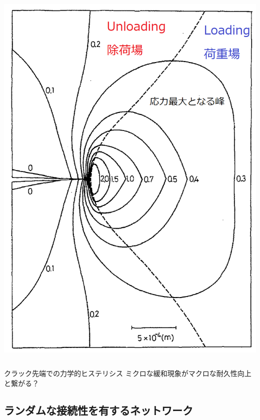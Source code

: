 \documentclass[12pt, dvipdfmx]{beamer}
\begin{document}
\begin{frame}
\begin{columns}[totalwidth=1\textwidth]
		\centering
		\includegraphics[width=\textwidth]{./crack.png}
	\end{columns}
	
	\begin{alertblock}{クラック先端での力学的ヒステリシス}
	\alert{ミクロな緩和現象}がマクロな耐久性向上と繋がる？
	\end{alertblock}
\end{frame}

\subsection{ランダムな接続性を有するネットワーク}
\end{document}
